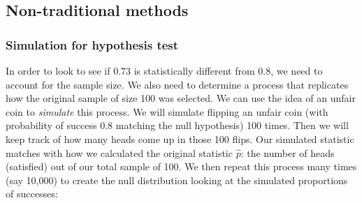 \documentclass[12pt,]{krantz}
\makeatletter
\newenvironment{Shaded}{\begin{snugshade}}{\end{snugshade}}
\newcommand{\KeywordTok}[1]{\textcolor[rgb]{0.27,0.27,0.27}{\textbf{#1}}}
\newcommand{\DataTypeTok}[1]{\textcolor[rgb]{0.27,0.27,0.27}{#1}}
\newcommand{\DecValTok}[1]{\textcolor[rgb]{0.06,0.06,0.06}{#1}}
\newcommand{\FloatTok}[1]{\textcolor[rgb]{0.06,0.06,0.06}{#1}}
\newcommand{\StringTok}[1]{\textcolor[rgb]{0.5,0.5,0.5}{#1}}
\newcommand{\OperatorTok}[1]{\textcolor[rgb]{0.43,0.43,0.43}{\textbf{#1}}}
\newcommand{\NormalTok}[1]{#1}
\newenvironment{kframe}{%
\medskip{}
\setlength{\fboxsep}{.8em}
 \def\at@end@of@kframe{}%
 \ifinner\ifhmode%
  \def\at@end@of@kframe{\end{minipage}}%
  \begin{minipage}{\columnwidth}%
 \fi\fi%
 \def\FrameCommand##1{\hskip\@totalleftmargin \hskip-\fboxsep
 \colorbox{shadecolor}{##1}\hskip-\fboxsep
     \hskip-\linewidth \hskip-\@totalleftmargin \hskip\columnwidth}%
 \MakeFramed {\advance\hsize-\width
   \@totalleftmargin\z@ \linewidth\hsize
   \@setminipage}}%
 {\par\unskip\endMakeFramed%
 \at@end@of@kframe}
\renewenvironment{Shaded}{\begin{kframe}}{\end{kframe}}
\theoremstyle{definition}
\theoremstyle{definition}
\theoremstyle{definition}
\theoremstyle{remark}
\makeatother
\begin{document}
\subsection{Non-traditional methods}\label{non-traditional-methods-1}

\subsubsection*{Simulation for hypothesis
test}\label{simulation-for-hypothesis-test}


In order to look to see if 0.73 is statistically different from 0.8, we
need to account for the sample size. We also need to determine a process
that replicates how the original sample of size 100 was selected. We can
use the idea of an unfair coin to \emph{simulate} this process. We will
simulate flipping an unfair coin (with probability of success 0.8
matching the null hypothesis) 100 times. Then we will keep track of how
many heads come up in those 100 flips. Our simulated statistic matches
with how we calculated the original statistic \(\hat{p}\): the number of
heads (satisfied) out of our total sample of 100. We then repeat this
process many times (say 10,000) to create the null distribution looking
at the simulated proportions of successes:

\begin{Shaded}
\end{Shaded}

\begin{Shaded}
\end{Shaded}
\end{document}
